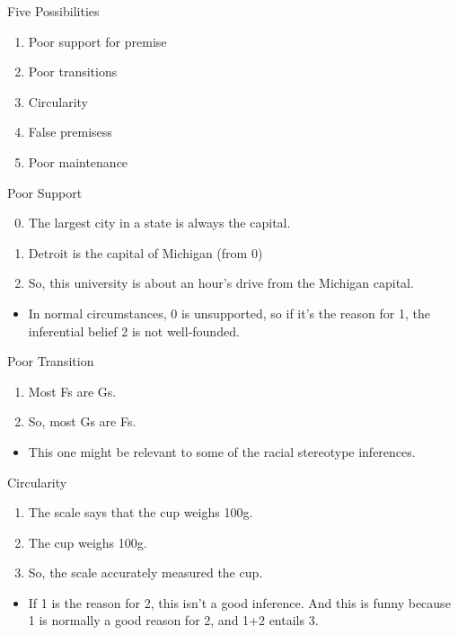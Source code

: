 \documentclass[
  17pt,
  letterpaper,
  ignorenonframetext,
  aspectratio=169,
  xcolor={dvipsnames}]{beamer}
\providecommand{\tightlist}{%
  \setlength{\itemsep}{0pt}\setlength{\parskip}{0pt}}\usepackage{longtable,booktabs,array}
\begin{document}
\begin{frame}{Five Possibilities}
\protect\hypertarget{five-possibilities}{}
\begin{enumerate}[<+->]
\tightlist
\item
  Poor support for premise
\item
  Poor transitions
\item
  Circularity
\item
  False premisess
\item
  Poor maintenance
\end{enumerate}
\end{frame}

\begin{frame}{Poor Support}
\protect\hypertarget{poor-support}{}
\begin{enumerate}[<+->]
\setcounter{enumi}{-1}
\tightlist
\item
  The largest city in a state is always the capital.
\item
  Detroit is the capital of Michigan (from 0)
\item
  So, this university is about an hour's drive from the Michigan
  capital.
\end{enumerate}

\begin{itemize}[<+->]
\tightlist
\item
  In normal circumstances, 0 is unsupported, so if it's the reason for
  1, the inferential belief 2 is not well-founded.
\end{itemize}
\end{frame}

\begin{frame}{Poor Transition}
\protect\hypertarget{poor-transition}{}
\begin{enumerate}[<+->]
\tightlist
\item
  Most Fs are Gs.
\item
  So, most Gs are Fs.
\end{enumerate}

\begin{itemize}[<+->]
\tightlist
\item
  This one might be relevant to some of the racial stereotype
  inferences.
\end{itemize}
\end{frame}

\begin{frame}{Circularity}
\protect\hypertarget{circularity}{}
\begin{enumerate}[<+->]
\tightlist
\item
  The scale says that the cup weighs 100g.
\item
  The cup weighs 100g.
\item
  So, the scale accurately measured the cup.
\end{enumerate}

\begin{itemize}[<+->]
\tightlist
\item
  If 1 is the reason for 2, this isn't a good inference. And this is
  funny because 1 is normally a good reason for 2, and 1+2 entails 3.
\end{itemize}
\end{frame}
\end{document}
